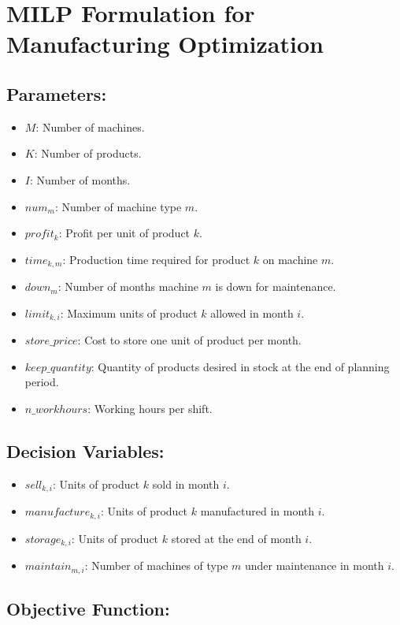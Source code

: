 \documentclass{article}
\begin{document}
\section*{MILP Formulation for Manufacturing Optimization}

\subsection*{Parameters:}

\begin{itemize}
    \item $M$: Number of machines.
    \item $K$: Number of products.
    \item $I$: Number of months.
    \item $num_{m}$: Number of machine type $m$.
    \item $profit_{k}$: Profit per unit of product $k$.
    \item $time_{k,m}$: Production time required for product $k$ on machine $m$.
    \item $down_{m}$: Number of months machine $m$ is down for maintenance.
    \item $limit_{k,i}$: Maximum units of product $k$ allowed in month $i$.
    \item $store\_price$: Cost to store one unit of product per month.
    \item $keep\_quantity$: Quantity of products desired in stock at the end of planning period.
    \item $n\_workhours$: Working hours per shift.
\end{itemize}

\subsection*{Decision Variables:}

\begin{itemize}
    \item $sell_{k,i}$: Units of product $k$ sold in month $i$.
    \item $manufacture_{k,i}$: Units of product $k$ manufactured in month $i$.
    \item $storage_{k,i}$: Units of product $k$ stored at the end of month $i$.
    \item $maintain_{m,i}$: Number of machines of type $m$ under maintenance in month $i$.
\end{itemize}

\subsection*{Objective Function:}
\end{document}
